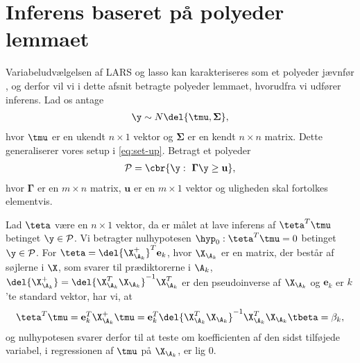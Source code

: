 \section{Inferens baseret på polyeder lemmaet} \label{subsec:teste_polyhedron}
Variabeludvælgelsen af LARS og lasso kan karakteriseres som et polyeder jævnfør \citep{post_inference}, og derfor vil vi i dette afsnit betragte polyeder lemmaet, hvorudfra vi udfører inferens.
Lad os antage
\begin{align*}
\y \sim N \del{\tmu,  \boldsymbol{\Sigma}},
\end{align*}
hvor \(\tmu\) er en ukendt \(n \times 1\) vektor og \(\boldsymbol{\Sigma}\) er en kendt \(n \times n\) matrix.
Dette generaliserer vores setup i \eqref{eq:set-up}.
Betragt et polyeder
\begin{align*}
\mathcal{P} = \cbr{\y : \ \boldsymbol{\Gamma} \y \geq \mathbf{u}},
\end{align*}
hvor \(\boldsymbol{\Gamma}\) er en \(m \times n\) matrix, \(\mathbf{u}\) er en \(m \times 1\) vektor og uligheden skal fortolkes elementvis.


Lad \(\teta\) være en \(n \times 1\) vektor, da er målet at lave inferens af  \(\teta^T \tmu\) betinget \(\y \in \mathcal{P}\).
Vi betragter nulhypotesen \(\hyp_0 : \teta^T \tmu = 0\) betinget \(\y \in \mathcal{P}\).
For \(\teta = \del{\X_{\A_k}^+}^T \mathbf{e}_k\), hvor \(\X_{\A_k}\) er en matrix, der består af søjlerne i \(\X\), som svarer til prædiktorerne i \(\A_k\), \( \del{\X_{\A_k}^+} = \del{\X_{\A_k}^T \X_{\A_k}}^{-1} \X_{\A_k}^T\) er den pseudoinverse af \(\X_{\A_k}\) og \(\mathbf{e}_k\) er \(k\)'te standard vektor, har vi, at
\begin{align*}
\teta^T \tmu = \mathbf{e}_k^T \X_{\A_k}^+ \tmu =  \mathbf{e}_k^T \del{\X_{\A_k}^T \X_{\A_k}}^{-1} \X_{\A_k}^T \X_{\A_k} \tbeta = \beta_k,
\end{align*}
og nulhypotesen svarer derfor til at teste om koefficienten af den sidst tilføjede variabel, i regressionen af \(\tmu\) på \(\X_{\A_k}\), er lig 0.


